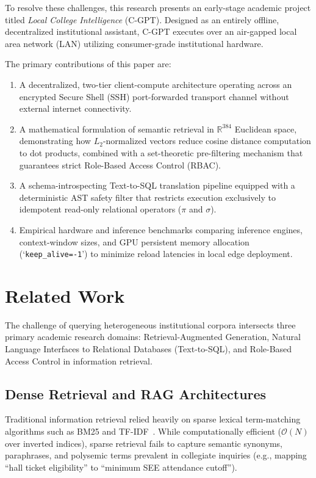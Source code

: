 \documentclass[conference]{IEEEtran}
\begin{document}
To resolve these challenges, this research presents an early-stage academic project titled \textit{Local College Intelligence} (C-GPT). Designed as an entirely offline, decentralized institutional assistant, C-GPT executes over an air-gapped local area network (LAN) utilizing consumer-grade institutional hardware. 

The primary contributions of this paper are:
\begin{enumerate}
    \item A decentralized, two-tier client-compute architecture operating across an encrypted Secure Shell (SSH) port-forwarded transport channel without external internet connectivity.
    \item A mathematical formulation of semantic retrieval in $\mathbb{R}^{384}$ Euclidean space, demonstrating how $L_2$-normalized vectors reduce cosine distance computation to dot products, combined with a set-theoretic pre-filtering mechanism that guarantees strict Role-Based Access Control (RBAC).
    \item A schema-introspecting Text-to-SQL translation pipeline equipped with a deterministic AST safety filter that restricts execution exclusively to idempotent read-only relational operators ($\pi$ and $\sigma$).
    \item Empirical hardware and inference benchmarks comparing inference engines, context-window sizes, and GPU persistent memory allocation (`\texttt{keep\_alive=-1}') to minimize reload latencies in local edge deployment.
\end{enumerate}

\section{Related Work}
The challenge of querying heterogeneous institutional corpora intersects three primary academic research domains: Retrieval-Augmented Generation, Natural Language Interfaces to Relational Databases (Text-to-SQL), and Role-Based Access Control in information retrieval.

\subsection{Dense Retrieval and RAG Architectures}
Traditional information retrieval relied heavily on sparse lexical term-matching algorithms such as BM25 and TF-IDF~\cite{salton1983extended}. While computationally efficient ($\mathcal{O}(N)$ over inverted indices), sparse retrieval fails to capture semantic synonyms, paraphrases, and polysemic terms prevalent in collegiate inquiries (e.g., mapping ``hall ticket eligibility'' to ``minimum SEE attendance cutoff'').
\end{document}
